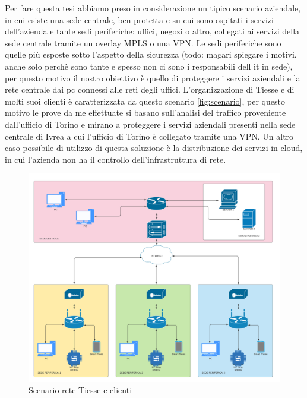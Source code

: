 Per fare questa tesi abbiamo preso in considerazione un tipico scenario aziendale, in cui esiste una sede centrale, ben protetta e su cui sono ospitati i servizi dell'azienda e tante sedi periferiche: uffici, negozi o altro, collegati ai servizi della sede centrale tramite un overlay MPLS o una VPN.
Le sedi periferiche sono quelle più esposte sotto l'aspetto della sicurezza (todo: magari spiegare i motivi. anche solo perchè sono tante e spesso non ci sono i responsabili dell it in sede), per questo motivo il nostro obiettivo è quello di proteggere i servizi aziendali e la rete centrale dai pc connessi alle reti degli uffici.
L'organizzazione di Tiesse e di molti suoi clienti è caratterizzata da questo scenario \ref{fig:scenario}, per questo motivo le prove da me effettuate si basano sull'analisi del traffico proveniente dall'ufficio di Torino e mirano a proteggere i servizi aziendali presenti nella sede centrale di Ivrea a cui l'ufficio di Torino è collegato tramite una VPN.
Un altro caso possibile di utilizzo di questa soluzione è la distribuzione dei servizi in cloud, in cui l'azienda non ha il controllo dell'infrastruttura di rete.



\begin{figure}[]
    \label{fig:scenario_2}
    \includegraphics[width=\hsize]{images/introduzione/scenario.png}
    \caption{Scenario rete Tiesse e clienti}
    \centering
\end{figure}




